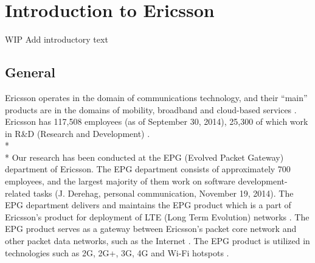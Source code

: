 \documentclass[final_report_innit.tex]{subfiles}
\begin{document}
\section{Introduction to Ericsson}
WIP
Add introductory text

\subsection{General}
Ericsson operates in the domain of communications technology, and their “main” products are in the domains of mobility, broadband and cloud-based services \cite{etc, ecf}. Ericsson has 117,508 employees (as of September 30, 2014), 25,300 of which work in R\&D (Research and Development) \cite{etc}.
\\* 
\\* 
Our research has been conducted at the EPG (Evolved Packet Gateway) department of Ericsson. The EPG department consists of approximately 700 employees, and the largest majority of them work on software development-related tasks (J. Derehag, personal communication, November 19, 2014). The EPG department delivers and maintains the EPG product which is a part of Ericsson’s product for deployment of LTE (Long Term Evolution) networks \cite{eepg}. The EPG product serves as a gateway between Ericsson’s packet core network and other packet data networks, such as the Internet \cite{eepg}. The EPG product is utilized in technologies such as 2G, 2G+, 3G, 4G and Wi-Fi hotspots \cite{eepg}.
\end{document}
